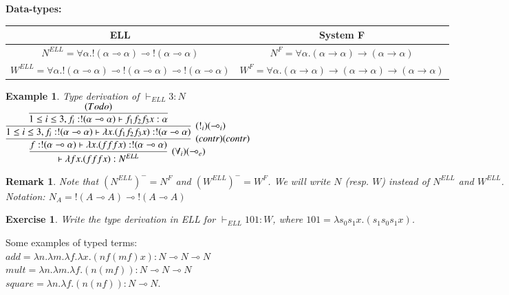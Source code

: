 \documentclass[a4paper,10pt]{article}
\newcommand{\impl}{\rightarrow}	%
\newcommand{\limpl}{\multimap}  %
\newtheorem{ex}{Example}
\newtheorem{exo}{Exercise}
\newtheorem{rmk}{Remark}
\begin{document}
\vspace{0.5cm}
\textbf{Data-types:}

\begin{center}
\begin{tabular}{|c|c|}
\hline
ELL & System F \\
\hline
$N^{ELL} = \forall \alpha. !(\alpha \limpl \alpha) \limpl !(\alpha \limpl \alpha)$ & $N^{F} = \forall \alpha. (\alpha \impl \alpha) \impl (\alpha \impl \alpha)$\\
\hline
$W^{ELL} = \forall \alpha. !(\alpha \limpl \alpha) \limpl !(\alpha \limpl \alpha) \limpl !(\alpha \limpl \alpha)$ & $W^{F} = \forall \alpha. (\alpha \impl \alpha) \impl (\alpha \impl \alpha) \impl (\alpha \impl \alpha)$\\
\hline
\end{tabular}
\end{center}


\begin{ex}{Type derivation of $\vdash_{ELL} 3:N$}\\

\vspace{0.3cm}
$ \infer[(\forall_i) (\limpl_e)]{\vdash \lambda f x.(f f f x) : N^{ELL}}
	{
	\infer[(contr) (contr)]{f: !(\alpha \limpl \alpha) \vdash \lambda x.(f f f x) : !(\alpha \limpl \alpha)}
		{
		\infer[(!_i) (\limpl_i)]{1 \leq i \leq 3, f_i: !(\alpha \limpl \alpha) \vdash \lambda x. (f_1 f_2 f_3 x) : !(\alpha \limpl \alpha)}
			{
				\infer{1 \leq i \leq 3, f_i: !(\alpha \limpl \alpha) \vdash f_1 f_2 f_3 x : \alpha}
				{(To do)}
			}
		}
	}$
\end{ex}

\begin{rmk}
Note that $(N^{ELL})^{-} = N^{F}$ and $(W^{ELL})^{-} = W^{F}$. We will write $N$ (resp. $W$) instead of $N^{ELL}$ and $W^{ELL}$.\\
Notation: $N_A = !(A \limpl A) \limpl !(A \limpl A)$
\end{rmk}

\begin{exo}
Write the type derivation in ELL for $\vdash_{ELL} 101 : W$, where $101 = \lambda s_0 s_1 x. (s_1 s_0 s_1 x)$.
\end{exo}

\par Some examples of typed terms:\\
$add = \lambda n. \lambda m. \lambda f. \lambda x. (n f (m f) x) : N \limpl N \limpl N$\\
$mult = \lambda n. \lambda m. \lambda f. (n (m f)) : N \limpl N \limpl N$\\
$square = \lambda n. \lambda f. (n (n f)) : N \limpl N$.
\end{document}
